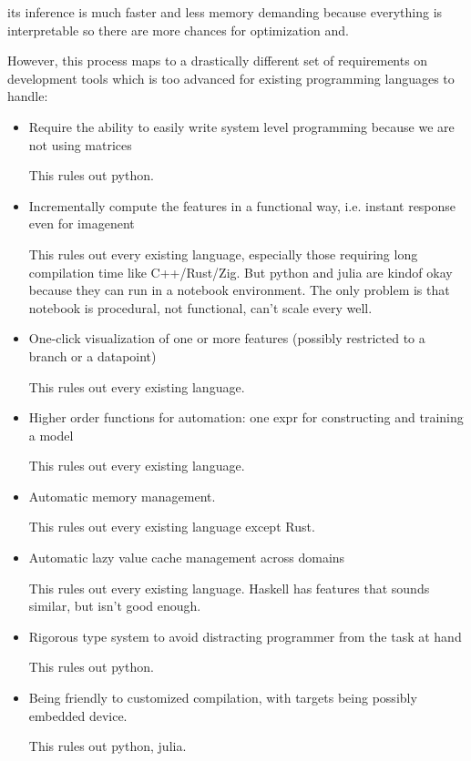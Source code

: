 \documentclass[11pt, oneside]{article}   	%
\theoremstyle{definition}
\begin{document}
its inference is much faster and less memory demanding because everything is interpretable so there are more chances for optimization and.

However, this process maps to a drastically different set of requirements on development tools which is too advanced for existing programming languages to handle:
\begin{itemize}
	\item Require the ability to easily write system level programming because we are not using matrices

	\begin{rmk}
		This rules out python.
	\end{rmk}
	\item Incrementally compute the features in a functional way, i.e. instant response even for imagenent

	\begin{rmk}
		This rules out every existing language, especially those requiring long compilation time like C++/Rust/Zig. But python and julia are kindof okay because they can run in a notebook environment. The only problem is that notebook is procedural, not functional, can't scale every well.
	\end{rmk}
	\item One-click visualization of one or more features (possibly restricted to a branch or a datapoint)

	\begin{rmk}
		This rules out every existing language.
	\end{rmk}
	\item Higher order functions for automation: one expr for constructing and training a model

	\begin{rmk}
		This rules out every existing language.
	\end{rmk}
	\item Automatic memory management.

	\begin{rmk}
		This rules out every existing language except Rust.
	\end{rmk}
	\item Automatic lazy value cache management across domains

	\begin{rmk}
		This rules out every existing language. Haskell has features that sounds similar, but isn't good enough.
	\end{rmk}
	\item Rigorous type system to avoid distracting programmer from the task at hand

	\begin{rmk}
		This rules out python.
	\end{rmk}
	\item Being friendly to customized compilation, with targets being possibly embedded device.

	\begin{rmk}
		This rules out python, julia.
	\end{rmk}
\end{itemize}
\end{document}
